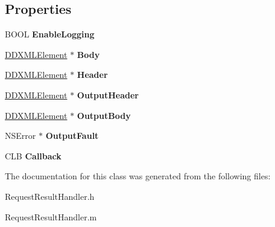 \subsection*{Properties}
\begin{DoxyCompactItemize}
\item 
\hypertarget{interface_request_result_handler_a1df28bc7eef64914bf586139dbd1b00e}{}B\+O\+O\+L {\bfseries Enable\+Logging}\label{interface_request_result_handler_a1df28bc7eef64914bf586139dbd1b00e}

\item 
\hypertarget{interface_request_result_handler_acb31fcc76c83883e35fb52da9a0ad4f1}{}\hyperlink{interface_d_d_x_m_l_element}{D\+D\+X\+M\+L\+Element} $\ast$ {\bfseries Body}\label{interface_request_result_handler_acb31fcc76c83883e35fb52da9a0ad4f1}

\item 
\hypertarget{interface_request_result_handler_a79ad8945931683af4d0d0802e8ab9b08}{}\hyperlink{interface_d_d_x_m_l_element}{D\+D\+X\+M\+L\+Element} $\ast$ {\bfseries Header}\label{interface_request_result_handler_a79ad8945931683af4d0d0802e8ab9b08}

\item 
\hypertarget{interface_request_result_handler_a9a8070e763f1255af9814deb4a9c8c1a}{}\hyperlink{interface_d_d_x_m_l_element}{D\+D\+X\+M\+L\+Element} $\ast$ {\bfseries Output\+Header}\label{interface_request_result_handler_a9a8070e763f1255af9814deb4a9c8c1a}

\item 
\hypertarget{interface_request_result_handler_a6ea9c134ef7b28df7a15fee033eb86b4}{}\hyperlink{interface_d_d_x_m_l_element}{D\+D\+X\+M\+L\+Element} $\ast$ {\bfseries Output\+Body}\label{interface_request_result_handler_a6ea9c134ef7b28df7a15fee033eb86b4}

\item 
\hypertarget{interface_request_result_handler_af9e8a2d7e79ff610b0d14b03968ce514}{}N\+S\+Error $\ast$ {\bfseries Output\+Fault}\label{interface_request_result_handler_af9e8a2d7e79ff610b0d14b03968ce514}

\item 
\hypertarget{interface_request_result_handler_a89c326344904ff230621773cb477c70b}{}C\+L\+B {\bfseries Callback}\label{interface_request_result_handler_a89c326344904ff230621773cb477c70b}

\end{DoxyCompactItemize}


The documentation for this class was generated from the following files\+:\begin{DoxyCompactItemize}
\item 
Request\+Result\+Handler.\+h\item 
Request\+Result\+Handler.\+m\end{DoxyCompactItemize}
